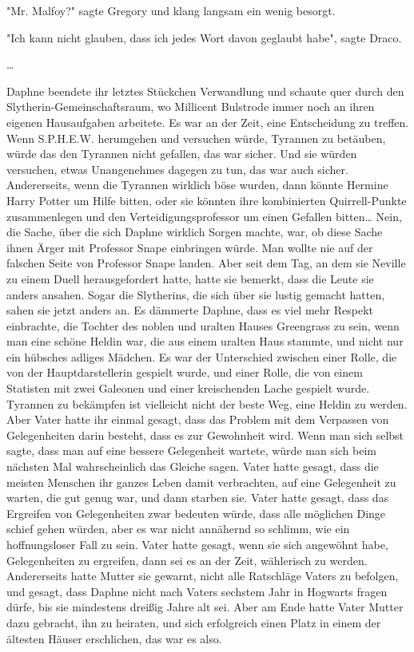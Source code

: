 {"Mr. Malfoy?" sagte Gregory und klang langsam ein wenig besorgt.

"Ich kann nicht glauben, dass ich jedes Wort davon geglaubt habe", sagte Draco.

…

Daphne beendete ihr letztes Stückchen Verwandlung und schaute quer durch den Slytherin-Gemeinschaftsraum, wo Millicent Bulstrode immer noch an ihren eigenen Hausaufgaben arbeitete. Es war an der Zeit, eine Entscheidung zu treffen. Wenn S.P.H.E.W. herumgehen und versuchen würde, Tyrannen zu betäuben, würde das den Tyrannen nicht gefallen, das war sicher. Und sie würden versuchen, etwas Unangenehmes dagegen zu tun, das war auch sicher. Andererseits, wenn die Tyrannen wirklich böse wurden, dann könnte Hermine Harry Potter um Hilfe bitten, oder sie könnten ihre kombinierten Quirrell-Punkte zusammenlegen und den Verteidigungsprofessor um einen Gefallen bitten… Nein, die Sache, über die sich Daphne wirklich Sorgen machte, war, ob diese Sache ihnen Ärger mit Professor Snape einbringen würde. Man wollte nie auf der falschen Seite von Professor Snape landen. Aber seit dem Tag, an dem sie Neville zu einem Duell herausgefordert hatte, hatte sie bemerkt, dass die Leute sie anders ansahen. Sogar die Slytherins, die sich über sie lustig gemacht hatten, sahen sie jetzt anders an. Es dämmerte Daphne, dass es viel mehr Respekt einbrachte, die Tochter des noblen und uralten Hauses Greengrass zu sein, wenn man eine schöne Heldin war, die aus einem uralten Haus stammte, und nicht nur ein hübsches adliges Mädchen. Es war der Unterschied zwischen einer Rolle, die von der Hauptdarstellerin gespielt wurde, und einer Rolle, die von einem Statisten mit zwei Galeonen und einer kreischenden Lache gespielt wurde. Tyrannen zu bekämpfen ist vielleicht nicht der beste Weg, eine Heldin zu werden. Aber Vater hatte ihr einmal gesagt, dass das Problem mit dem Verpassen von Gelegenheiten darin besteht, dass es zur Gewohnheit wird. Wenn man sich selbst sagte, dass man auf eine bessere Gelegenheit wartete, würde man sich beim nächsten Mal wahrscheinlich das Gleiche sagen. Vater hatte gesagt, dass die meisten Menschen ihr ganzes Leben damit verbrachten, auf eine Gelegenheit zu warten, die gut genug war, und dann starben sie. Vater hatte gesagt, dass das Ergreifen von Gelegenheiten zwar bedeuten würde, dass alle möglichen Dinge schief gehen würden, aber es war nicht annähernd so schlimm, wie ein hoffnungsloser Fall zu sein. Vater hatte gesagt, wenn sie sich angewöhnt habe, Gelegenheiten zu ergreifen, dann sei es an der Zeit, wählerisch zu werden. Andererseits hatte Mutter sie gewarnt, nicht alle Ratschläge Vaters zu befolgen, und gesagt, dass Daphne nicht nach Vaters sechstem Jahr in Hogwarts fragen dürfe, bis sie mindestens dreißig Jahre alt sei. Aber am Ende hatte Vater Mutter dazu gebracht, ihn zu heiraten, und sich erfolgreich einen Platz in einem der ältesten Häuser erschlichen, das war es also.

}
